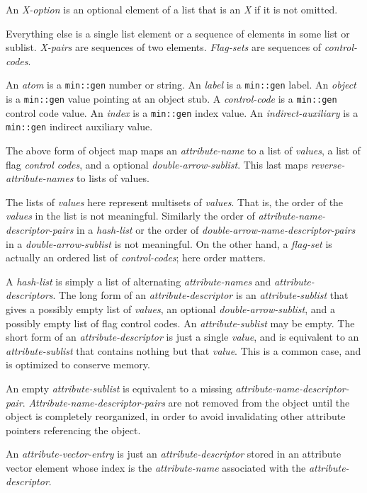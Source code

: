 \documentclass[12pt]{article}
\begin{document}
An {\em X-option} is an optional element of a list that is an {\em X} if
it is not omitted.

Everything else is a single list element or
a sequence of elements in some list or sublist.
{\em X-pairs} are sequences of two elements.
{\em Flag-sets} are sequences of {\em control-codes}.

An {\em atom} is a \verb|min::gen| number or string.
An {\em label} is a \verb|min::gen| label.
An {\em object} is a \verb|min::gen| value pointing at an object stub.
A {\em control-code} is a \verb|min::gen| control code value.
An {\em index} is a \verb|min::gen| index value.
An {\em indirect-auxiliary} is a \verb|min::gen| indirect auxiliary value.

The above form of object map maps an {\em attribute-name} to a list of
{\em values}, a list of flag {\em control codes}, and a optional
{\em double-arrow-sublist}.  This last maps {\em reverse-attribute-names}
to lists of values.

The lists of {\em values} here represent multisets of {\em values}.
That is, the
order of the {\em values} in the list is not meaningful.
Similarly the order of {\em attribute-name-descriptor-pairs}
in a {\em hash-list}
or the order of {\em double-arrow-name-descriptor-pairs}
in a {\em double-arrow-sublist} is not meaningful.
On the other hand, a {\em flag-set} is actually an ordered list
of {\em control-codes}; here order matters.

A {\em hash-list} is simply a list of alternating {\em attribute-names}
and {\em attribute-descriptors}.
The long form of an {\em attribute-descriptor} is an
{\em attribute-sublist} that gives  a possibly empty list of {\em values},
an optional {\em double-arrow-sublist}, and a possibly empty
list of flag control codes.
An {\em attribute-sublist} may be empty.
The short form of an {\em attribute-descriptor} is just a single
{\em value}, and is equivalent to an {\em attribute-sublist}
that contains nothing but that {\em value}.
This is a common case, and is optimized to conserve memory.

An empty {\em attribute-sublist} is equivalent to a missing
{\em attribute-name-descriptor-pair}.
{\em Attri\-bute-name-descriptor-pairs} are not
removed from the object until the object is completely reorganized,
in order to avoid invalidating other attribute pointers referencing the object.

An {\em attribute-vector-entry} is just an {\em attribute-descriptor}
stored in an attribute vector element whose index is the
{\em attribute-name} associated with the {\em attribute-descriptor}.
\end{document}

